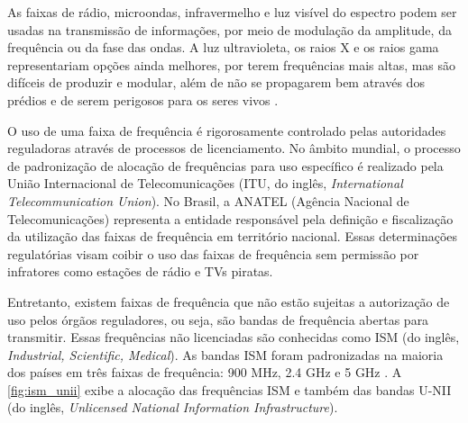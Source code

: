 \begin{figure}[H]
	\centering
\end{figure}

\begin{citacao}
	As faixas de rádio, microondas, infravermelho e luz visível do espectro podem ser usadas na transmissão de informações, por meio de modulação da amplitude, da frequência ou da fase das ondas. A luz ultravioleta, os raios X e os raios gama representariam opções ainda melhores, por terem frequências mais altas, mas são difíceis de produzir e modular, além de não se propagarem bem através dos prédios e de serem perigosos para os seres vivos \cite[p.~65]{tanenbaum2011}.
\end{citacao}

O uso de uma faixa de frequência é rigorosamente controlado pelas autoridades reguladoras através de processos de licenciamento. No âmbito mundial, o processo de padronização de alocação de frequências para uso específico é realizado pela União Internacional de Telecomunicações (ITU, do inglês, \textit{International Telecommunication Union}). No Brasil, a ANATEL (Agência Nacional de Telecomunicações) representa a entidade responsável pela definição e fiscalização da utilização das faixas de frequência em território nacional. Essas determinações regulatórias visam coibir o uso das faixas de frequência sem permissão por infratores como estações de rádio e TVs piratas.

Entretanto, existem faixas de frequência que não estão sujeitas a autorização de uso pelos órgãos reguladores, ou seja, são bandas de frequência abertas para transmitir. Essas frequências não licenciadas são conhecidas como ISM (do inglês, \textit{Industrial, Scientific, Medical}). As bandas ISM foram padronizadas na maioria dos países em três faixas de frequência: 900 MHz, 2.4 GHz e 5 GHz \cite{moraes2010,tanenbaum2011}. A \autoref{fig:ism_unii} exibe a alocação das frequências ISM e também das bandas U-NII (do inglês, \textit{Unlicensed National Information Infrastructure}).

